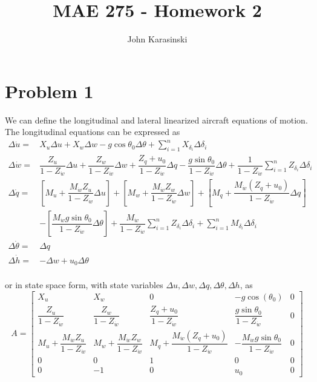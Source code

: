 \documentclass[12pt]{article}
\title{MAE 275 - Homework 2}
\author{John Karasinski}
\begin{document}
\maketitle

\section{Problem 1}
We can define the longitudinal and lateral linearized aircraft equations of motion. The longitudinal equations can be expressed as
\begin{equation}
\begin{split}
\Delta \dot{u} = &X_u \Delta u + X_w \Delta w - g\cos \theta_0 \Delta \theta + \sum\limits_{i=1}^n X_{\delta_i} \Delta \delta_i \\
\Delta \dot{w} = &\dfrac{Z_u}{1-Z_{\dot{w}}} \Delta u +
                  \dfrac{Z_w}{1-Z_{\dot{w}}} \Delta w +
                  \dfrac{Z_q + u_0}{1-Z_{\dot{w}}} \Delta q -
                  \dfrac{g\sin \theta_0}{1-Z_{\dot{w}}} \Delta \theta +
                  \dfrac{1}{1-Z_{\dot{w}}} \sum\limits_{i=1}^n Z_{\delta_i} \Delta \delta_i \\
\Delta \dot{q} = &\left[ M_u + \dfrac{M_{\dot{w}} Z_u}{1-Z_{\dot{w}}} \Delta u  \right] +
                  \left[ M_w + \dfrac{M_{\dot{w}} Z_w}{1-Z_{\dot{w}}} \Delta w  \right] +
                  \left[ M_q + \dfrac{M_{\dot{w}} (Z_q + u_0)}{1-Z_{\dot{w}}} \Delta q  \right] \\
                 & - \left[ \dfrac{M_{\dot{w}} g\sin \theta_0}{1-Z_{\dot{w}}} \Delta \theta  \right]
                   + \dfrac{M_{\dot{w}}}{1-Z_{\dot{w}}} \sum\limits_{i=1}^n Z_{\delta_i} \Delta \delta_i
                   + \sum\limits_{i=1}^n M_{\delta_i} \Delta \delta_i \\
\Delta \dot{\theta} = &\Delta q \\
\Delta \dot{h} = &-\Delta w + u_0 \Delta \theta \\
\end{split}
\label{long}
\end{equation}

\noindent or in state space form, with state variables $\Delta u, \Delta w, \Delta q, \Delta \theta, \Delta h $, as
\begin{equation*}
A =
\begin{bmatrix}
    X_u & X_w & 0 & -g \cos(\theta_0) & 0 \\
    \dfrac{Z_u}{1-Z_{\dot{w}}} & \dfrac{Z_w}{1-Z_{\dot{w}}} & \dfrac{Z_q + u_0}{1-Z_{\dot{w}}} & \dfrac{g\sin \theta_0}{1-Z_{\dot{w}}} & 0 \\
    M_u + \dfrac{M_{\dot{w}} Z_u}{1-Z_{\dot{w}}} & M_w + \dfrac{M_{\dot{w}} Z_w}{1-Z_{\dot{w}}} & M_q + \dfrac{M_{\dot{w}} (Z_q + u_0)}{1-Z_{\dot{w}}} & -\dfrac{M_{\dot{w}} g\sin \theta_0}{1-Z_{\dot{w}}} & 0 \\
    0 & 0 & 1 & 0 & 0 \\
    0 & -1 & 0 & u_0 & 0
\end{bmatrix}
\end{equation*}
\end{document}
